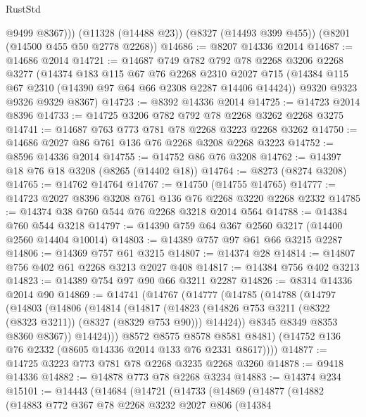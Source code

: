 \begin{lexlean}{RustStd}
\begin{coremodule}
          @9499
          @8367)))
    (@11328 (@14488 @23))
    (@8327 (@14493 @399 @455))
    (@8201 (@14500 @455 @50 @2778 @2268))
@14686 := @8207 @14336 @2014
@14687 := @14686 @2014
@14721 := @14687
    @749
    @782
    @792
    @78
    @2268
    @3206
    @2268
    @3277
    (@14374
      @183
      @115
      @67
      @76
      @2268
      @2310
      @2027
      @715
      (@14384 @115 @67 @2310 (@14390 @97 @64 @66 @2308 @2287 @14406 @14424))
      @9320
      @9323
      @9326
      @9329
      @8367)
@14723 := @8392 @14336 @2014
@14725 := @14723 @2014 @8396
@14733 := @14725 @3206 @782 @792 @78 @2268 @3262 @2268 @3275
@14741 := @14687 @763 @773 @781 @78 @2268 @3223 @2268 @3262
@14750 := @14686 @2027 @86 @761 @136 @76 @2268 @3208 @2268 @3223
@14752 := @8596 @14336 @2014
@14755 := @14752 @86 @76 @3208
@14762 := @14397 @18 @76 @18 @3208 (@8265 (@14402 @18))
@14764 := @8273 (@8274 @3208)
@14765 := @14762 @14764
@14767 := @14750 (@14755 @14765)
@14777 := @14723 @2027 @8396 @3208 @761 @136 @76 @2268 @3220 @2268 @2332
@14785 := @14374 @38 @760 @544 @76 @2268 @3218 @2014 @564
@14788 := @14384 @760 @544 @3218
@14797 := @14390 @759 @64 @367 @2560 @3217 (@14400 @2560 @14404 @10014)
@14803 := @14389 @757 @97 @61 @66 @3215 @2287
@14806 := @14369 @757 @61 @3215
@14807 := @14374 @28
@14814 := @14807 @756 @402 @61 @2268 @3213 @2027 @408
@14817 := @14384 @756 @402 @3213
@14823 := @14389 @754 @97 @90 @66 @3211 @2287
@14826 := @8314 @14336 @2014 @90
@14869 := @14741
    (@14767
      (@14777
        (@14785
          (@14788
            (@14797
              (@14803
                (@14806
                  (@14814
                    (@14817
                      (@14823
                        (@14826 @753 @3211 (@8322 (@8323 @3211)) (@8327 (@8329 @753 @90)))
                        @14424))
                    @8345
                    @8349
                    @8353
                    @8360
                    @8367))
                @14424)))
          @8572
          @8575
          @8578
          @8581
          @8481)
        (@14752 @136 @76 @2332 (@8605 @14336 @2014 @133 @76 @2331 @8617))))
@14877 := @14725 @3223 @773 @781 @78 @2268 @3235 @2268 @3260
@14878 := @9418 @14336
@14882 := @14878 @773 @78 @2268 @3234
@14883 := @14374 @234
@15101 := @14443
    (@14684
      (@14721
        (@14733
          (@14869
            (@14877
              (@14882
                (@14883
                  @772
                  @367
                  @78
                  @2268
                  @3232
                  @2027
                  @806
                  (@14384

\end{coremodule}
\end{lexlean}

